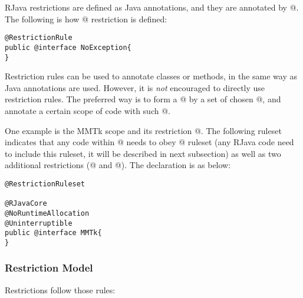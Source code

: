 \documentclass[12pt]{article}
\begin{document}
RJava restrictions are defined as Java annotations, and they are
annotated by @. 
The following is how @ restriction is defined:

\begin{lstlisting}
@RestrictionRule
public @interface NoException{
}
\end{lstlisting}

Restriction rules can be used to annotate classes or methods, in the same way as
Java annotations are used. However, it is \emph{not} encouraged to directly use
restriction rules. The preferred way is to form a @ by
a set of chosen @, and annotate a certain scope of code 
with such @. 

One example is the MMTk scope and its restriction @. The following
ruleset indicates that any code within @ needs to obey 
@ ruleset (any RJava code need to include this ruleset, it will be
described in next subsection) as well as two additional restrictions
(@ and @). The
declaration is as below:

\begin{lstlisting}
@RestrictionRuleset

@RJavaCore
@NoRuntimeAllocation
@Uninterruptible
public @interface MMTk{
}
\end{lstlisting}

\subsubsection{Restriction Model}
Restrictions follow those rules:
\end{document}
